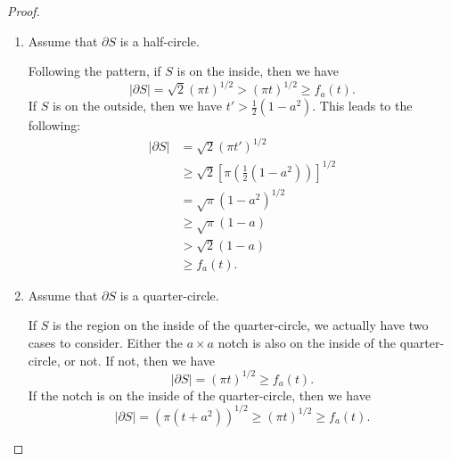 \documentclass[leqno]{article}
\numberwithin{equation}{section}
\theoremstyle{definition}
\theoremstyle{remark}
\theoremstyle{plain}
\begin{document}
{\begin{proof}
\begin{enumerate}
        Similar to the first case, either $S$ is the region inside of the three-quarter-circle or the region outside the three-quarter-circle. If $S$ is inside, then we have
        \[
            |\partial S| = \sqrt3(\pi t)^{1/2} > (\pi t)^{1/2} \geq f_a(t).
        \]
        If $S$ is the region on the outside, then we have
        \begin{align*}
            |\partial S| &= \sqrt{3}(\pi t')^{1/2} \\
            &\geq \sqrt{3}\left[\pi \left(\frac{1}{2}(1-a^2)\right)\right]^{1/2} \\
            &= \sqrt{3\pi}(1-a^2)^{1/2} \\
            &\geq \sqrt{3\pi}(1-a) \\
            &> \sqrt{2}(1-a) \\
            &\geq f_a(t).
        \end{align*}
        \item Assume that $\partial S$ is a half-circle.

        Following the pattern, if $S$ is on the inside, then we have
        \[
            |\partial S| = \sqrt{2}(\pi t)^{1/2} > (\pi t)^{1/2} \geq f_a(t).
        \]
        If $S$ is on the outside, then we have $t' > \frac{1}{2}(1-a^2)$. This leads to the following:
        \begin{align*}
            |\partial S| &= \sqrt{2}(\pi t')^{1/2} \\
            &\geq \sqrt{2}\left[\pi \left(\frac{1}{2}(1-a^2)\right)\right]^{1/2} \\
            &= \sqrt{\pi}(1-a^2)^{1/2} \\
            &\geq \sqrt{\pi}(1-a) \\
            &> \sqrt{2}(1-a) \\
            &\geq f_a(t).
        \end{align*}
        
        
        \item Assume that $\partial S$ is a quarter-circle.

        If $S$ is the region on the inside of the quarter-circle, we actually have two cases to consider. Either the $a \times a$ notch is also on the inside of the quarter-circle, or not. If not, then we have
        \[
            |\partial S| = (\pi t)^{1/2} \geq f_a(t).
        \]
        If the notch is on the inside of the quarter-circle, then we have
        \[
            |\partial S| = \left(\pi(t+a^2)\right)^{1/2} \geq (\pi t)^{1/2} \geq f_a(t).
        \]
        

\end{enumerate}
\end{proof}}
\end{document}
